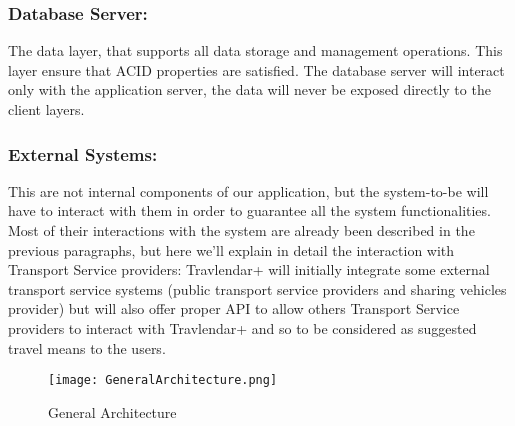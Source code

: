 \subsubsection{Database Server:}
\label{subsubsect:Database Server}
The data layer, that supports all data storage and management operations. This layer ensure that ACID properties are satisfied. The database server will interact only with the application server, the data will never be exposed directly to the client layers.
\subsubsection{External Systems:}
\label{subsubsect:External Systems}
This are not internal components of our application, but the system-to-be will have to interact with them in order to guarantee all the system functionalities.
Most of their interactions with the system are already been described in the previous paragraphs, but here we'll explain in detail the interaction with Transport Service providers: Travlendar+ will initially integrate some external transport service systems (public transport service providers and sharing vehicles provider) but will also offer proper API to allow others Transport Service providers to interact with Travlendar+ and so to be considered as suggested travel means to the users.


\begin{figure}[H]
\begin{center}
		\hspace*{-50pt}
		\texttt{[image: GeneralArchitecture.png]}
\end{center}
\caption{General Architecture}
\end{figure}
